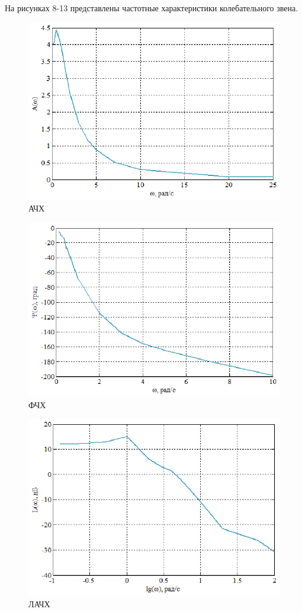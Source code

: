 \documentclass[a4paper,12pt]{article} %
\begin{document}
На рисунках 8-13 представлены частотные характеристики колебательного звена.
\begin{figure}[H]
	\centering
	\includegraphics[width=1\linewidth]{scheme/Ach2.eps}
	\caption{АЧХ}
\end{figure}
\begin{figure}[H]
	\centering
	\includegraphics[width=1\linewidth]{scheme/Fch2.eps}
	\caption{ФЧХ}
\end{figure}
\begin{figure}[H]
	\centering
	\includegraphics[width=1\linewidth]{scheme/Lach2.eps}
	\caption{ЛАЧХ}
\end{figure}
\end{document}
